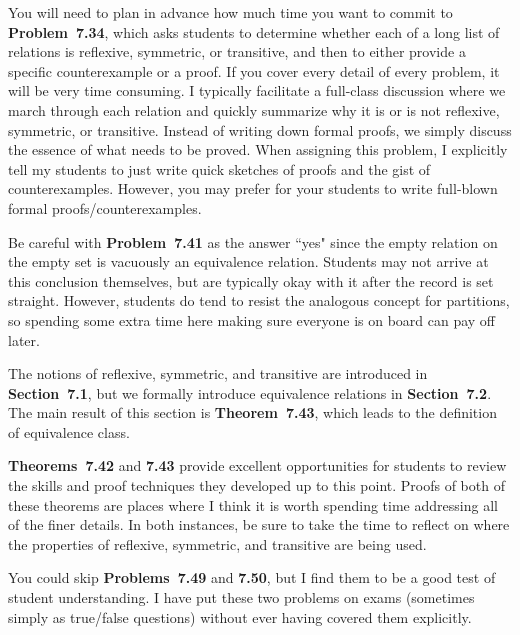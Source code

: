 \documentclass[11pt]{article}%
\newcommand{\blankline}{\pagebreak[2]\vspace{.5\baselineskip}}
\begin{document}
\blankline

You will need to plan in advance how much time you want to commit to \textbf{Problem~7.34}, which asks students to determine whether each of a long list of relations is reflexive, symmetric, or transitive, and then to either provide a specific counterexample or a proof.  If you cover every detail of every problem, it will be very time consuming.  I typically facilitate a full-class discussion where we march through each relation and quickly summarize why it is or is not reflexive, symmetric, or transitive.  Instead of writing down formal proofs, we simply discuss the essence of what needs to be proved.  When assigning this problem, I explicitly tell my students to just write quick sketches of proofs and the gist of counterexamples.  However, you may prefer for your students to write full-blown formal proofs/counterexamples. 

\blankline

Be careful with \textbf{Problem~7.41} as the answer ``yes" since the empty relation on the empty set is vacuously an equivalence relation.  Students may not arrive at this conclusion themselves, but are typically okay with it after the record is set straight.  However, students do tend to resist the analogous concept for partitions, so spending some extra time here making sure everyone is on board can pay off later. 

The notions of reflexive, symmetric, and transitive are introduced in \textbf{Section~7.1}, but we formally introduce equivalence relations in \textbf{Section~7.2}. The main result of this section is \textbf{Theorem~7.43}, which leads to the definition of equivalence class.  

\blankline

\textbf{Theorems~7.42} and \textbf{7.43} provide excellent opportunities for students to review the skills and proof techniques they developed up to this point.  Proofs of both of these theorems are places where I think it is worth spending time addressing all of the finer details.  In both instances, be sure to take the time to reflect on where the properties of reflexive, symmetric, and transitive are being used.

\blankline

You could skip \textbf{Problems~7.49} and \textbf{7.50}, but I find them to be a good test of student understanding.  I have put these two problems on exams (sometimes simply as true/false questions) without ever having covered them explicitly.
\end{document}
